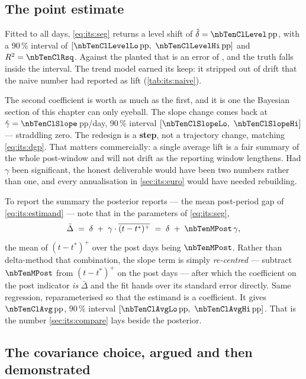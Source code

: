 \subsection*{The point estimate}

Fitted to all \nbTenNDays{} days, \cref{eq:its:seg} returns a level shift of
$\hat\delta = \pp{\nbTenClLevel}$, with a 90\,\% interval of
$[\pp{\nbTenClLevelLo},\ \pp{\nbTenClLevelHi}]$
and $R^2 = \nbTenClRsq$. Against the planted \pp{+\nbTenTrueLift} that is an error of
\pp{\nbTenClLevelErr}, and the truth falls inside the interval. The trend model earned its keep:
it stripped out \pp{\nbTenClDriftRemoved} of drift that the naive number had reported as lift
(\cref{tab:its:naive}).

The second coefficient is worth as much as the first, and it is one the Bayesian section of this
chapter can only eyeball. The slope change comes back at
$\hat\gamma = \nbTenClSlope$\,pp/day, 90\,\% interval
$[\nbTenClSlopeLo,\ \nbTenClSlopeHi]$ --- straddling zero. The redesign is a \textbf{step}, not a
trajectory change, matching \cref{eq:its:dgp}. That matters commercially: a single average lift is
a fair summary of the whole post-window and will not drift as the reporting window lengthens. Had
$\gamma$ been significant, the honest deliverable would have been two numbers rather than one, and
every annualisation in \cref{sec:its:euro} would have needed rebuilding.

To report the summary the posterior reports --- the mean post-period gap of
\cref{eq:its:estimand} --- note that in the parameters of \cref{eq:its:seg},
%
\begin{equation}
  \bar\Delta \;=\; \delta \;+\; \gamma \cdot \overline{(t - t^{*})^{+}}
             \;=\; \delta \;+\; \nbTenMPost\,\gamma ,
  \label{eq:its:recentre}
\end{equation}
%
the mean of $(t - t^{*})^{+}$ over the \nbTenNPost{} post days being $\nbTenMPost$. Rather than
delta-method that combination, the slope term is simply \emph{re-centred} --- subtract
$\nbTenMPost$ from
$(t - t^{*})^{+}$ on the post days --- after which the coefficient on the post indicator \emph{is}
$\bar\Delta$ and the fit hands over its standard error directly. Same regression, reparameterised
so that the estimand is a coefficient. It gives $\pp{\nbTenClAvg}$, 90\,\% interval
$[\pp{\nbTenClAvgLo},\ \pp{\nbTenClAvgHi}]$. That is the number \cref{sec:its:compare} lays beside
the posterior.

\subsection*{The covariance choice, argued and then demonstrated}

